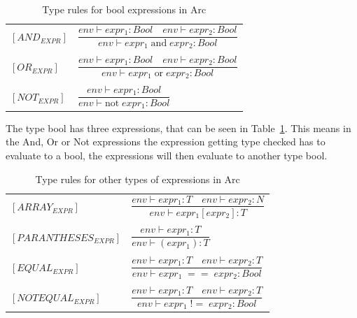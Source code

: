 \begin{table}[htb!]
    \centering
    \begin{tabular}{ll}
        \toprule
        $[AND_{EXPR}] $ & $\dfrac
            {env\vdash expr_1: Bool \quad env\vdash expr_2: Bool}
            {env\vdash expr_1 \;\text{and} \;expr_2: Bool}$
        \\
        \\
        $[OR_{EXPR}] $  & $\dfrac
            {env\vdash expr_1: Bool \quad env\vdash expr_2: Bool}
            {env\vdash expr_1 \;\text{or} \;expr_2: Bool}$
        \\
        \\
        $[NOT_{EXPR}] $ & $\dfrac
            {env\vdash expr_1: Bool}
            {env\vdash \text{not} \; expr_1 : Bool}$
        \\
        \bottomrule
    \end{tabular}
    \caption{Type rules for bool expressions in Arc}
    \label{tab:bool-rules}
\end{table}


The type bool has three expressions, that can be seen in Table~\ref{tab:bool-rules}. This means in the And, Or or Not expressions the expression getting type checked has to evaluate to a bool, the expressions will then evaluate to another type bool.


\begin{table}[htb!]
    \centering
    \begin{tabular}{ll}
        \toprule
        $[ARRAY_{EXPR}]$       & $ \dfrac
            {env\vdash expr_1: T \quad env \vdash expr_2 : N}
            {env\vdash expr_1[expr_2] : T}$
        \\
        \\
        $[PARANTHESES_{EXPR}]$ & $ \dfrac
            {env\vdash expr_1: T}
            {env\vdash (expr_1) : T}$
        \\
        \\
        $[EQUAL_{EXPR}] $      & $\dfrac
            {env\vdash expr_1: T \quad env\vdash expr_2: T}
            {env\vdash expr_1 \;== \;expr_2: Bool}$
        \\
        \\
        $[NOTEQUAL_{EXPR}] $   & $\dfrac
            {env\vdash expr_1: T \quad env\vdash expr_2: T}
            {env\vdash expr_1 \;!= \;expr_2: Bool}$
        \\
        \bottomrule
    \end{tabular}
    \caption{Type rules for other types of expressions in Arc}
    \label{tab:expr-rules}
\end{table}


